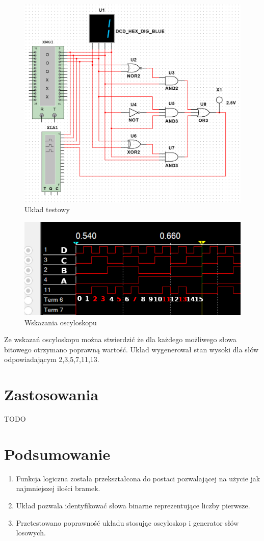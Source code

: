 \documentclass[12pt,a4paper,openright]{mwrep}
\begin{document}
\begin{figure}[H]
    \centering
    \includegraphics[width=1\textwidth]{images/1b_schema_2.PNG}
    \caption{Układ testowy}
    \label{rys:1b_test_circuit}
\end{figure}
\begin{figure}[H]
    \centering
    \includegraphics[width=1\textwidth]{images/1b_result.PNG}
    \caption{Wskazania oscyloskopu}
    \label{rys:1b_test_results}
\end{figure}
Ze wskazań oscyloskopu można stwierdzić że dla każdego możliwego słowa bitowego otrzymano poprawną wartość.
Układ wygenerował stan wysoki dla słów odpowiadającym 2,3,5,7,11,13.
\section{Zastosowania}
TODO
\section{Podsumowanie}
\begin{enumerate}
    \item Funkcja logiczna została przekształcona do postaci pozwalającej na użycie jak najmniejszej ilości bramek.
    \item Układ pozwala identyfikować słowa binarne reprezentujące liczby pierwsze.
    \item Przetestowano poprawność układu stosując oscyloskop i generator słów losowych.
\end{enumerate}
\end{document}
